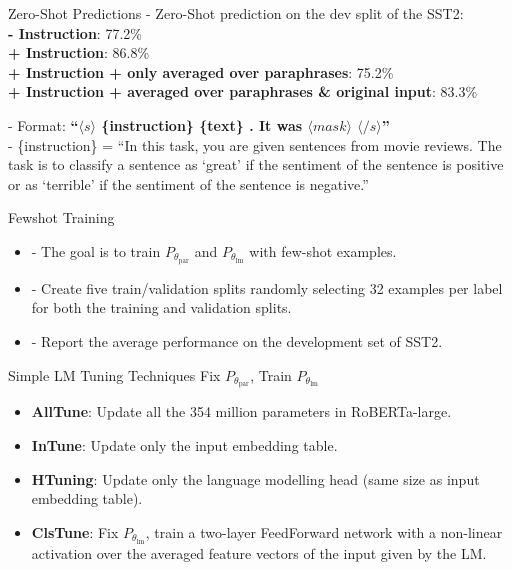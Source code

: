 \documentclass{beamer}
\begin{document}
\begin{frame}{Zero-Shot Predictions}
- Zero-Shot prediction on the dev split of the SST2:\\
\textbf{- Instruction}: 77.2\%\\
\textbf{+ Instruction}: 86.8\%\\
\textbf{+ Instruction + only averaged over paraphrases}: 75.2\%\\
\textbf{+ Instruction + averaged over paraphrases \& original input}: 83.3\%

 \medskip  \medskip  \medskip
- Format: \textbf{``$\langle s \rangle$ {\color{purple}\{instruction\}} \{text\} . It was $\langle mask \rangle$ $\langle /s \rangle$''}\\
 \medskip
- {\color{purple}\{instruction\} =
“In this task, you are given sentences from movie
reviews. The task is to classify a sentence as ‘great’ if
the sentiment of the sentence is positive or as ‘terrible’
if the sentiment of the sentence is negative.”}

\end{frame}

\begin{frame}{Fewshot Training}
    \begin{itemize}
    \item - The goal is to train $P_{\theta_{\text{par}}}$ and $P_{\theta_{\text{lm}}}$ with few-shot examples.
    \medskip
    \medskip
    \item - Create five train/validation splits randomly selecting 32 examples per label for both the training and validation splits.
    \medskip
    \medskip
    \item - Report the average performance on the development set of SST2.
    \end{itemize}
\end{frame}

\begin{frame}{Simple LM Tuning Techniques}
Fix $P_{\theta_{\text{par}}}$, Train $P_{\theta_{\text{lm}}}$
\medskip
\medskip
    \begin{itemize}
        \item \textbf{AllTune}: Update all the 354 million parameters in RoBERTa-large.
        \medskip
        \medskip
        \item \textbf{InTune}: Update only the input embedding table.
        \medskip
        \medskip
        \item \textbf{HTuning}: Update only the language modelling head (same size as input embedding table).
        \medskip
        \medskip
        \item \textbf{ClsTune}:
        Fix $P_{\theta_{\text{lm}}}$, train a two-layer FeedForward network with a non-linear activation over the averaged feature vectors of the input given by the LM.
    \end{itemize}
\end{frame}
\end{document}
